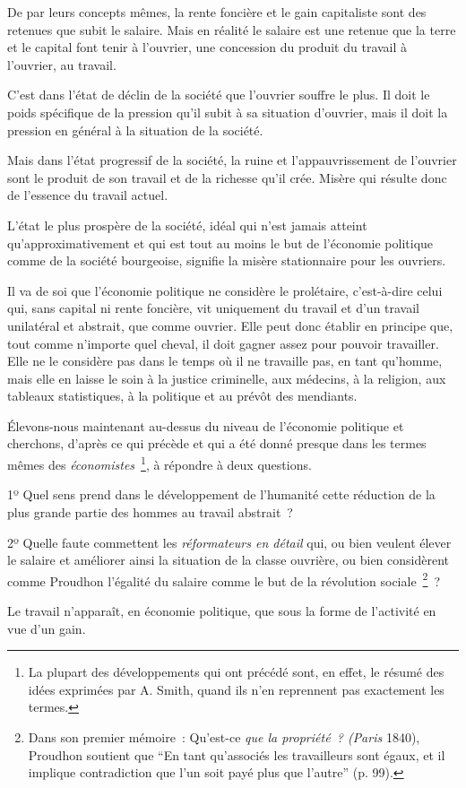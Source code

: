 \documentclass[french,twoside]{book} %
\newcommand\foreign[1]{\emph{#1}}
\begin{document}
\noindent De par leurs concepts mêmes, la rente foncière et le gain capitaliste sont des retenues que subit le salaire. Mais en réalité le salaire est une retenue que la terre et le capital font tenir à l’ouvrier, une concession du produit du travail à l’ouvrier, au travail.\par
C’est dans l’état de déclin de la société que l’ouvrier souffre le plus. Il doit le poids spécifique de la pression qu’il subit à sa situation d’ouvrier, mais il doit la pression en général à la situation de la société.\par
Mais dans l’état progressif de la société, la ruine et l’appauvrissement de l’ouvrier sont le produit de son travail et de la richesse qu’il crée. Misère qui résulte donc de l’essence du travail actuel.\par
L’état le plus prospère de la société, idéal qui n’est jamais atteint qu’approximativement et qui est tout au moins le but de l’économie politique comme de la société bourgeoise, signifie la misère stationnaire pour les ouvriers.\par
Il va de soi que l’économie politique ne considère le prolétaire, c’est-à-dire celui qui, sans capital ni rente foncière, vit uniquement du travail et d’un travail unilatéral et abstrait, que comme ouvrier. Elle peut donc établir en principe que, tout comme n’importe quel cheval, il doit gagner assez pour pouvoir travailler. Elle ne le considère pas dans le temps où il ne travaille pas, en tant qu’homme, mais elle en laisse le soin à la justice criminelle, aux médecins, à la religion, aux tableaux statistiques, à la politique et au prévôt des mendiants.\par
Élevons-nous maintenant au-dessus du niveau de l’économie politique et cherchons, d’après ce qui précède et qui a été donné presque dans les termes mêmes des \foreign{économistes} \footnote{La plupart des développements qui ont précédé sont, en effet, le résumé des idées exprimées par A. Smith, quand ils n’en reprennent pas exactement les termes.}, à répondre à deux questions.\par
1º Quel sens prend dans le développement de l’humanité cette réduction de la plus grande partie des hommes au travail abstrait ?\par
2º Quelle faute commettent les \foreign{réformateurs en détail} qui, ou bien veulent élever le salaire et améliorer ainsi la situation de la classe ouvrière, ou bien considèrent comme Proudhon l’égalité du salaire comme le but de la révolution sociale \footnote{Dans son premier mémoire : Qu’est-ce \emph{que la propriété ? (Paris} 1840), Proudhon soutient que “En tant qu’associés les travailleurs sont égaux, et il implique contradiction que l’un soit payé plus que l’autre” (p. 99).} ?\par
Le travail n’apparaît, en économie politique, que sous la forme de l’activité en vue d’un gain.\par
\end{document}
